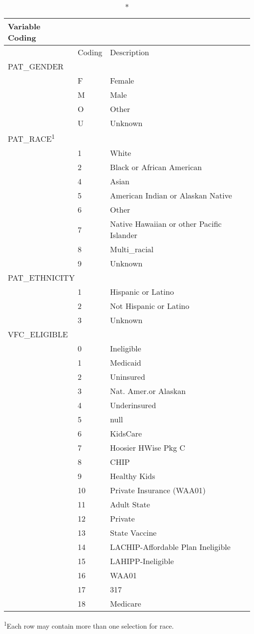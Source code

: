 \documentclass[
  letterpaper,
  DIV=11,
  numbers=noendperiod]{scrreprt}
\begin{document}
\setlength{\LTpost}{0mm}
\begin{longtable}{l|ll}
\caption*{
{\large Variable Coding}
} \\ 
\toprule
\multicolumn{1}{l}{} & Coding & Description \\ 
\midrule
\multicolumn{3}{l}{PAT\_GENDER} \\ 
\midrule
  & F & Female \\ 
  & M & Male \\ 
  & O & Other \\ 
  & U & Unknown \\ 
\midrule
\multicolumn{3}{l}{PAT\_RACE\textsuperscript{1}} \\ 
\midrule
  & 1 & White \\ 
  & 2 & Black or African American \\ 
  & 4 & Asian \\ 
  & 5 & American Indian or Alaskan Native \\ 
  & 6 & Other \\ 
  & 7 & Native Hawaiian or other Pacific Islander \\ 
  & 8 & Multi\_racial \\ 
  & 9 & Unknown \\ 
\midrule
\multicolumn{3}{l}{PAT\_ETHNICITY} \\ 
\midrule
  & 1 & Hispanic or Latino \\ 
  & 2 & Not Hispanic or Latino \\ 
  & 3 & Unknown \\ 
\midrule
\multicolumn{3}{l}{VFC\_ELIGIBLE} \\ 
\midrule
  & 0 & Ineligible \\ 
  & 1 & Medicaid \\ 
  & 2 & Uninsured \\ 
  & 3 & Nat. Amer.or Alaskan \\ 
  & 4 & Underinsured \\ 
  & 5 & null \\ 
  & 6 & KidsCare \\ 
  & 7 & Hoosier HWise Pkg C \\ 
  & 8 & CHIP \\ 
  & 9 & Healthy Kids \\ 
  & 10 & Private Insurance (WAA01) \\ 
  & 11 & Adult State \\ 
  & 12 & Private \\ 
  & 13 & State Vaccine \\ 
  & 14 & LACHIP-Affordable Plan Ineligible \\ 
  & 15 & LAHIPP-Ineligible \\ 
  & 16 & WAA01 \\ 
  & 17 & 317 \\ 
  & 18 & Medicare \\ 
\bottomrule
\end{longtable}
\begin{minipage}{\linewidth}
\textsuperscript{1}Each row may contain more than one selection for race.\\
\end{minipage}
\end{document}
